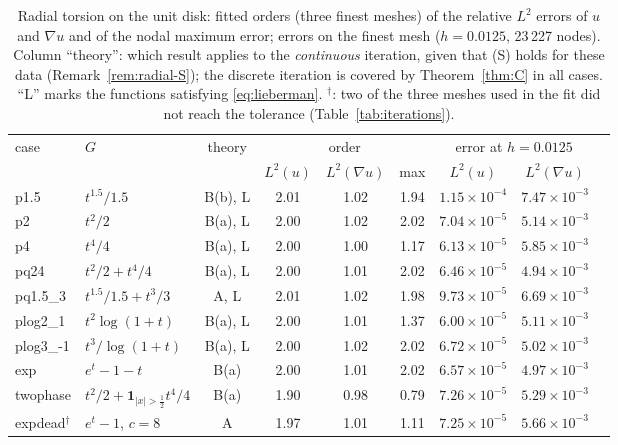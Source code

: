 \documentclass[11pt]{amsart}
\theoremstyle{definition}
\theoremstyle{remark}
\numberwithin{equation}{section}
\newcommand{\abs}[1]{\lvert #1\rvert}
\begin{document}
\begin{table}[t]
\caption{Radial torsion on the unit disk: fitted orders (three finest meshes) of the relative $L^2$ errors of $u$ and $\nabla u$ and of the nodal maximum error; errors on the finest mesh ($h=0.0125$, 23\,227 nodes). Column ``theory'': which result applies to the \emph{continuous} iteration, given that (S) holds for these data (Remark~\ref{rem:radial-S}); the discrete iteration is covered by Theorem~\ref{thm:C} in all cases. ``L'' marks the functions satisfying \eqref{eq:lieberman}. $^\dagger$: two of the three meshes used in the fit did not reach the tolerance (Table~\ref{tab:iterations}).}\label{tab:orders}
\small
\begin{tabular}{@{}llccccccc@{}}
\toprule
case & $G$ & theory & \multicolumn{3}{c}{order} & \multicolumn{2}{c}{error at $h=0.0125$}\\
\cmidrule(lr){4-6}\cmidrule(lr){7-8}
& & & $L^2(u)$ & $L^2(\nabla u)$ & max & $L^2(u)$ & $L^2(\nabla u)$\\
\midrule
p1.5 & $t^{1.5}/1.5$ & B(b), L & 2.01 & 1.02 & 1.94 & $1.15\times10^{-4}$ & $7.47\times10^{-3}$\\
p2 & $t^2/2$ & B(a), L & 2.00 & 1.02 & 2.02 & $7.04\times10^{-5}$ & $5.14\times10^{-3}$\\
p4 & $t^4/4$ & B(a), L & 2.00 & 1.00 & 1.17 & $6.13\times10^{-5}$ & $5.85\times10^{-3}$\\
pq24 & $t^2/2+t^4/4$ & B(a), L & 2.00 & 1.01 & 2.02 & $6.46\times10^{-5}$ & $4.94\times10^{-3}$\\
pq1.5\_3 & $t^{1.5}/1.5+t^3/3$ & A, L & 2.01 & 1.02 & 1.98 & $9.73\times10^{-5}$ & $6.69\times10^{-3}$\\
plog2\_1 & $t^2\log(1+t)$ & B(a), L & 2.00 & 1.01 & 1.37 & $6.00\times10^{-5}$ & $5.11\times10^{-3}$\\
plog3\_-1 & $t^3/\log(1+t)$ & B(a), L & 2.00 & 1.02 & 2.02 & $6.72\times10^{-5}$ & $5.02\times10^{-3}$\\
exp & $e^t-1-t$ & B(a) & 2.00 & 1.01 & 2.02 & $6.57\times10^{-5}$ & $4.97\times10^{-3}$\\
twophase & $t^2/2+\mathbf 1_{\abs x>\frac12}t^4/4$ & B(a) & 1.90 & 0.98 & 0.79 & $7.26\times10^{-5}$ & $5.29\times10^{-3}$\\
expdead$^\dagger$ & $e^t-1$, $c=8$ & A & 1.97 & 1.01 & 1.11 & $7.25\times10^{-5}$ & $5.66\times10^{-3}$\\
\bottomrule
\end{tabular}
\end{table}
\end{document}
